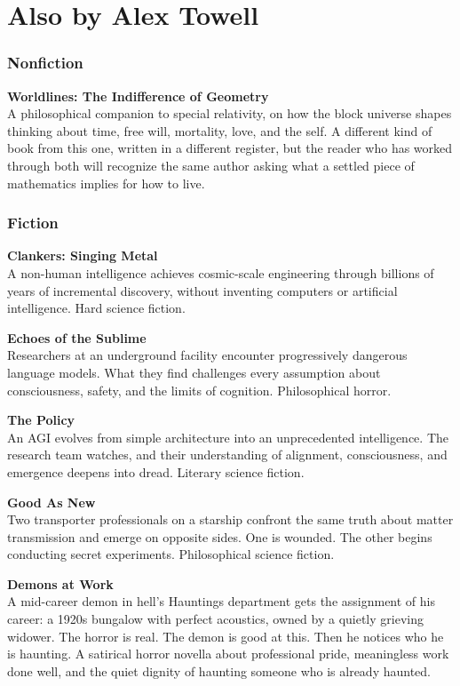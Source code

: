 \chapter*{Also by Alex Towell}

\subsection*{Nonfiction}

\textbf{Worldlines: The Indifference of Geometry}\\
A philosophical companion to special relativity, on how the block universe shapes thinking about time, free will, mortality, love, and the self. A different kind of book from this one, written in a different register, but the reader who has worked through both will recognize the same author asking what a settled piece of mathematics implies for how to live.

\subsection*{Fiction}

\textbf{Clankers: Singing Metal}\\
A non-human intelligence achieves cosmic-scale engineering through billions of years of incremental discovery, without inventing computers or artificial intelligence. Hard science fiction.

\bigskip

\textbf{Echoes of the Sublime}\\
Researchers at an underground facility encounter progressively dangerous language models. What they find challenges every assumption about consciousness, safety, and the limits of cognition. Philosophical horror.

\bigskip

\textbf{The Policy}\\
An AGI evolves from simple architecture into an unprecedented intelligence. The research team watches, and their understanding of alignment, consciousness, and emergence deepens into dread. Literary science fiction.

\bigskip

\textbf{Good As New}\\
Two transporter professionals on a starship confront the same truth about matter transmission and emerge on opposite sides. One is wounded. The other begins conducting secret experiments. Philosophical science fiction.

\bigskip

\textbf{Demons at Work}\\
A mid-career demon in hell's Hauntings department gets the assignment of his career: a 1920s bungalow with perfect acoustics, owned by a quietly grieving widower. The horror is real. The demon is good at this. Then he notices who he is haunting. A satirical horror novella about professional pride, meaningless work done well, and the quiet dignity of haunting someone who is already haunted.
